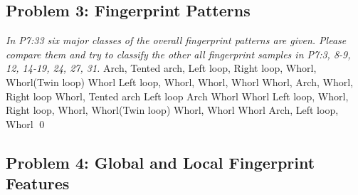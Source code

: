 \documentclass[
        ]{beamer}
\begin{document}
    \subsection{Problem 3: Fingerprint Patterns}
    
    		\begin{frame}[t]{\subsecname}
    			\begin{overprint}
    			\emph{In P7:33 six major classes of the overall fingerprint patterns are given. Please compare them and try to classify the other all fingerprint samples in P7:3, 8-9, 12, 14-19, 24, 27, 31.}
    				\onslide<2>  %
    				Arch, Tented arch, Left loop, Right loop, Whorl, Whorl(Twin loop)
    				\onslide<3>  %
    				\alert{Whorl}
    				\onslide<4>  %
    				\alert{Left loop, Whorl, Whorl, Whorl}
    				\onslide<5>  %
    				\alert{Whorl, Arch, Whorl, Right loop}
    				\onslide<6>  %
    				\alert{Whorl, Tented arch}
    				\onslide<7>  %
    				\alert{Left loop}
    				\onslide<8>  %
    				\alert{Arch}
    				\onslide<9>  %
    				\alert{Whorl}    				
    				\onslide<10>  %
    				\alert{Whorl}
    				\onslide<11>  %
    				\onslide<12>  %
    				\alert{Left loop, Whorl, Right loop, Whorl, Whorl(Twin loop)}
    				\onslide<13>  %
    				\alert{Whorl, Whorl}
    				\onslide<14>  %
    				\alert{Whorl}
    				\onslide<15>  %
    				\alert{Arch, Left loop, Whorl}
							\qed		
    			\end{overprint}
    		\end{frame}

    \subsection{Problem 4: Global and Local Fingerprint Features}
    
\end{document}
